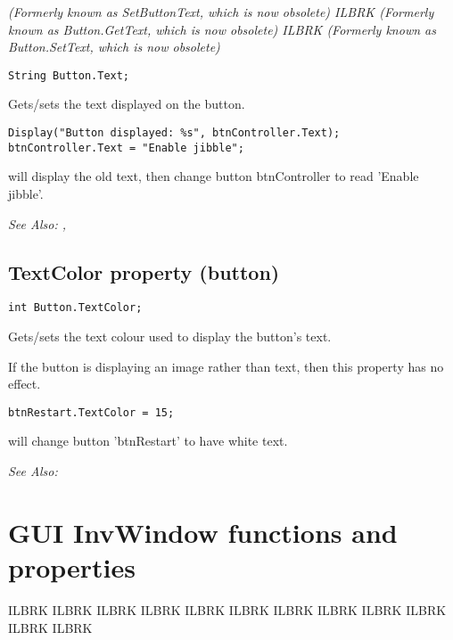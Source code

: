 \it{(Formerly known as SetButtonText, which is now obsolete)} ILBRK
\it{(Formerly known as Button.GetText, which is now obsolete)} ILBRK
\it{(Formerly known as Button.SetText, which is now obsolete)}

\begin{verbatim}
String Button.Text;
\end{verbatim}
Gets/sets the text displayed on the button.

\begin{verbatim}
Display("Button displayed: %s", btnController.Text);
btnController.Text = "Enable jibble";
\end{verbatim}
will display the old text, then change button btnController to read 'Enable jibble'.

\it{See Also:} , 


\subsection{TextColor property (button)}\label{Button.TextColor}%

\begin{verbatim}
int Button.TextColor;
\end{verbatim}
Gets/sets the text colour used to display the button's text.

If the button is displaying an image rather than text, then this property has no effect.

\begin{verbatim}
btnRestart.TextColor = 15;
\end{verbatim}
will change button 'btnRestart' to have white text.

\it{See Also:} 



\section{GUI InvWindow functions and properties}\label{GUIInvFuncs}%

ILBRK
ILBRK
ILBRK
ILBRK
ILBRK
ILBRK
ILBRK
ILBRK
ILBRK
ILBRK
ILBRK
ILBRK


